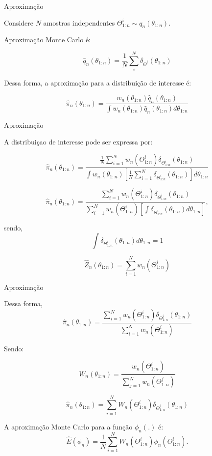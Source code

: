 \documentclass{beamer}
\begin{document}
\begin{frame}{Aproximação}

Considere $N$  amostras independentes $\Theta^i_{1:n} \sim q_n(\theta_{1:n})$.

\pause
\vspace{0.5cm}

Aproximação Monte Carlo é:

$$
\hat{q}_n(\theta_{1:n}) = \frac{1}{N} \sum^N_i \delta_{\Theta^i}(\theta_{1:n})
$$

\vspace{0.5cm}

Dessa forma, a aproximação para a distribuição de interesse é:

\pause

$$
\hat{\pi}_n(\theta_{1:n}) = \frac{w_n(\theta_{1:n})\hat{q}_n(\theta_{1:n})}{\int w_n(\theta_{1:n})\hat{q}_n(\theta_{1:n}) d\theta_{1:n}}
$$


\end{frame}




\begin{frame}{Aproximação}

A distribuiçao de interesse pode ser expressa por:

$$\hat{\pi}_n(\theta_{1:n})= \frac{\frac{1}{N} \sum^N_{i=1} w_n(\Theta^i_{1:n})\delta_{\Theta^i_{1:n}}(\theta_{1:n})}{ \int  w_n(\theta_{1:n})\left[ \frac{1}{N} \sum^N_{i=1} \delta_{\Theta^i_{1:n}}(\theta_{1:n}) \right] d\theta_{1:n}} $$

\pause


$$\hat{\pi}_n(\theta_{1:n})= \frac{ \sum^N_{i=1} w_n(\Theta^i_{1:n})\delta_{\Theta^i_{1:n}}(\theta_{1:n})}{   \sum^N_{i=1} w_n(\Theta^i_{1:n})\left[ \int \delta_{\Theta^i_{1:n}}(\theta_{1:n}) d\theta_{1:n} \right] }, $$

\pause
sendo,
$$ \int \delta_{\Theta^i_{1:n}}(\theta_{1:n}) d\theta_{1:n} =1 $$

$$\hat{Z}_n(\theta_{1:n})=    \sum^N_{i=1} w_n(\Theta^i_{1:n}) $$


\end{frame}



\begin{frame}{Aproximação}

Dessa forma,
$$\hat{\pi}_n(\theta_{1:n})= \frac{\sum^N_{i=1} w_n(\Theta^i_{1:n})\delta_{\Theta^i_{1:n}}(\theta_{1:n})}{\sum^N_{i=1} w_n(\Theta^i_{1:n})} $$

\pause

Sendo:

$$W_n(\theta_{1:n})= \frac{ w_n(\Theta^i_{1:n})}{ \sum^N_{j=1} w_n(\Theta^j_{1:n})} $$

\pause

$$\hat{\pi}_n(\theta_{1:n})= \sum^N_{i=1} W_n(\Theta^i_{1:n})\delta_{\Theta^i_{1:n}}(\theta_{1:n}) $$

\pause
A aproximação Monte Carlo para a função $\phi_n(.)$ é:
$$
\hat{E}(\phi_n) = \frac{1}{N} \sum_{i=1}^N W_n(\Theta^i_{1:n}) \phi_n(\Theta^i_{1:n}).
$$

\end{frame}
\end{document}
